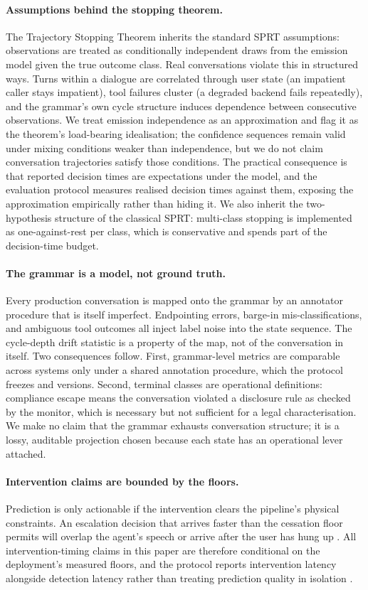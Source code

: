 \paragraph{Assumptions behind the stopping theorem.}
The Trajectory Stopping Theorem inherits the standard SPRT assumptions: observations are treated as conditionally independent draws from the emission model given the true outcome class.
Real conversations violate this in structured ways.
Turns within a dialogue are correlated through user state (an impatient caller stays impatient), tool failures cluster (a degraded backend fails repeatedly), and the grammar's own cycle structure induces dependence between consecutive observations.
We treat emission independence as an approximation and flag it as the theorem's load-bearing idealisation; the confidence sequences remain valid under mixing conditions weaker than independence, but we do not claim conversation trajectories satisfy those conditions.
The practical consequence is that reported decision times are expectations under the model, and the evaluation protocol measures realised decision times against them, exposing the approximation empirically rather than hiding it.
We also inherit the two-hypothesis structure of the classical SPRT: multi-class stopping is implemented as one-against-rest per class, which is conservative and spends part of the decision-time budget.

\paragraph{The grammar is a model, not ground truth.}
Every production conversation is mapped onto the grammar by an annotator procedure that is itself imperfect.
Endpointing errors, barge-in mis-classifications, and ambiguous tool outcomes all inject label noise into the state sequence.
The cycle-depth drift statistic is a property of the map, not of the conversation in itself.
Two consequences follow.
First, grammar-level metrics are comparable across systems only under a shared annotation procedure, which the protocol freezes and versions.
Second, terminal classes are operational definitions: compliance escape means the conversation violated a disclosure rule as checked by the monitor, which is necessary but not sufficient for a legal characterisation.
We make no claim that the grammar exhausts conversation structure; it is a lossy, auditable projection chosen because each state has an operational lever attached.

\paragraph{Intervention claims are bounded by the floors.}
Prediction is only actionable if the intervention clears the pipeline's physical constraints.
An escalation decision that arrives faster than the cessation floor permits will overlap the agent's speech or arrive after the user has hung up \citep{garcia2026cessationfloor}.
All intervention-timing claims in this paper are therefore conditional on the deployment's measured floors, and the protocol reports intervention latency alongside detection latency rather than treating prediction quality in isolation \citep{garcia2026latencyfloor}.

